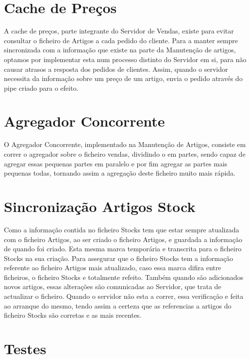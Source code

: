 \documentclass[a4paper]{report}
\begin{document}
\chapter{Cache de Preços}

A cache de preços, parte integrante do Servidor de Vendas, existe para
evitar consultar o ficheiro de Artigos a cada pedido do cliente.
Para a manter sempre sincronizada com a informação que existe na parte da
Manutenção de artigos, optamos por implementar esta num processo distinto
do Servidor em si, para não causar atrasos a resposta dos pedidos de clientes.
Assim, quando o servidor necessita da informação sobre um preço de um artigo,
envia o pedido através do pipe criado para o efeito.

\chapter{Agregador Concorrente}

O Agregador Concorrente, implementado na Manutenção de Artigos, consiste
em correr o agregador sobre o ficheiro vendas, dividindo o em partes, sendo
capaz de agregar essas pequenas partes em paralelo e por fim agregar as 
partes mais pequenas todas, tornando assim a agregação deste ficheiro muito
mais rápida.

\chapter{Sincronização Artigos Stock}

Como a informação contida no ficheiro Stocks tem que estar sempre atualizada
com o ficheiro Artigos, ao ser criado o ficheiro Artigos, e guardada a 
informação de quando foi criado. Esta mesma marca temporária e transcrita para
o ficheiro Stocks na sua criação. Para assegurar que o ficheiro Stocks
tem a informação referente ao ficheiro Artigos mais atualizado, caso essa marca
difira entre ficheiros, o ficheiro Stocks e totalmente refeito. Também quando são
adicionados novos artigos, essas alterações são comunicadas ao Servidor, que trata
de actualizar o ficheiro. Quando o servidor não esta a correr, essa verificação
e feita ao arranque do mesmo, tendo assim a certeza que as referencias a artigos
do ficheiro Stocks são corretas e as mais recentes.

\chapter{Testes}
\end{document}

